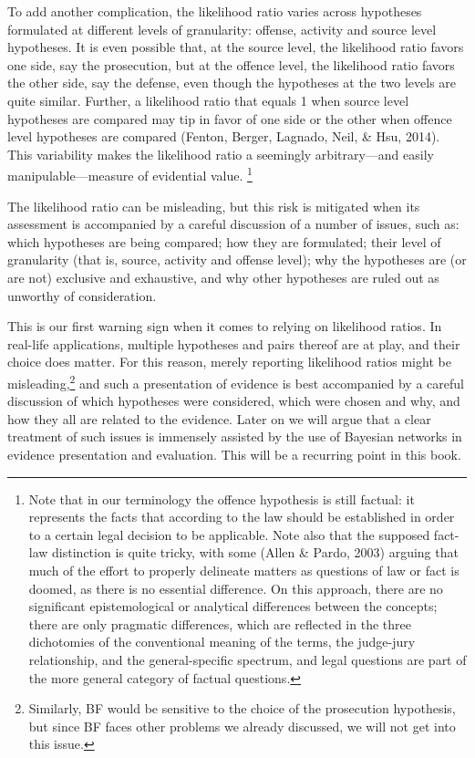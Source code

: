 \documentclass[
  10pt,
  dvipsnames,enabledeprecatedfontcommands]{scrartcl}
\newcommand{\mar}[1]{\todo[color=blue!40]{#1}}
\begin{document}
To add another complication, the likelihood ratio varies across
hypotheses formulated at different levels of granularity: offense,
activity and source level hypotheses. It is even possible that, at the
source level, the likelihood ratio favors one side, say the prosecution,
but at the offence level, the likelihood ratio favors the other side,
say the defense, even though the hypotheses at the two levels are quite
similar. Further, a likelihood ratio that equals 1 when source level
hypotheses are compared may tip in favor of one side or the other when
offence level hypotheses are compared (Fenton, Berger, Lagnado, Neil, \&
Hsu, 2014). This variability makes the likelihood ratio a seemingly
arbitrary---and easily manipulable---measure of evidential value.
\mar{R added footnote here, check.}\footnote{Note that in our
  terminology the offence hypothesis is still factual: it represents the
  facts that according to the law should be established in order to a
  certain legal decision to be applicable. Note also that the supposed
  fact-law distinction is quite tricky, with some (Allen \& Pardo, 2003)
  arguing that much of the effort to properly delineate matters as
  questions of law or fact is doomed, as there is no essential
  difference. On this approach, there are no significant epistemological
  or analytical differences between the concepts; there are only
  pragmatic differences, which are reflected in the three dichotomies of
  the conventional meaning of the terms, the judge-jury relationship,
  and the general-specific spectrum, and legal questions are part of the
  more general category of factual questions.}

The likelihood ratio can be misleading, but this risk is mitigated when
its assessment is accompanied by a careful discussion of a number of
issues, such as: which hypotheses are being compared; how they are
formulated; their level of granularity (that is, source, activity and
offense level); why the hypotheses are (or are not) exclusive and
exhaustive, and why other hypotheses are ruled out as unworthy of
consideration.

This is our first warning sign when it comes to relying on likelihood
ratios. In real-life applications, multiple hypotheses and pairs thereof
are at play, and their choice does matter. For this reason, merely
reporting likelihood ratios might be
misleading,\footnote{Similarly, BF would be sensitive to the choice of the prosecution hypothesis, but since BF faces other problems we already discussed, we will not get into this issue.}
and such a presentation of evidence is best accompanied by a careful
discussion of which hypotheses were considered, which were chosen and
why, and how they all are related to the evidence. Later on we will
argue that a clear treatment of such issues is immensely assisted by the
use of Bayesian networks in evidence presentation and evaluation. This
will be a recurring point in this book.
\end{document}
